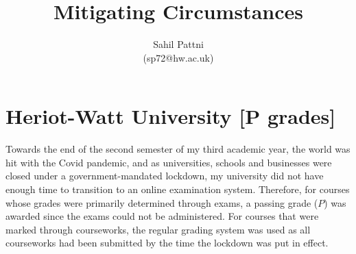 \documentclass[a4paper,11pt]{article}
\begin{document}
\title{Mitigating Circumstances}

\author{Sahil Pattni\\(sp72@hw.ac.uk)}
\date{}
\maketitle

\section*{Heriot-Watt University [P grades]}
Towards the end of the second semester of my third academic year, the world was hit with the Covid pandemic, and as universities, schools and businesses were closed under a government-mandated lockdown, my university did not have enough time to transition to an online examination system. Therefore, for courses whose grades were primarily determined through exams, a passing grade ($P$) was awarded since the exams could not be administered. For courses that were marked through courseworks, the regular grading system was used as all courseworks had been submitted by the time the lockdown was put in effect.
\end{document}
